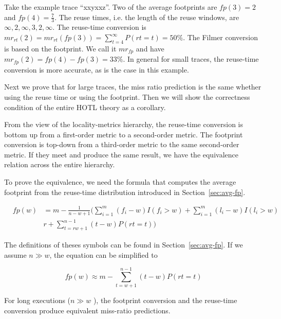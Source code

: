 Take the example trace ``xxyxxz''.  Two of the average footprints are
$fp(3) = 2$ and $fp(4) = \frac{7}{3}$.  The reuse times, i.e. the
length of the reuse windows, are $\infty, 2, \infty, 3, 2, \infty$.
The reuse-time conversion is $mr_{rt}( 2 ) = mr_{rt}(fp(3) ) =
\sum_{t=4}^{\infty} P(rt = t) = 50\%$. The Filmer conversion is based
on the footprint.  We call it $mr_{fp}$ and have $mr_{fp}( 2 ) = fp(4)
- fp(3) = 33\%$. In general for small traces, the reuse-time
conversion is more accurate, as is the case in this example.

\medskip

Next we prove that for large traces, the miss ratio prediction is the
same whether using the reuse time or using the footprint.  Then we
will show the correctness condition of the entire HOTL theory as a corollary.

From the view of the locality-metrics hierarchy, the reuse-time conversion is
bottom up from a first-order metric to a second-order metric.
The footprint conversion is top-down from a third-order metric to
the same second-order metric.  If they meet and produce the same result,
we have the equivalence relation across the entire hierarchy.

To prove the equivalence, we need the formula that computes the
average footprint from the reuse-time distribution introduced in
Section~\ref{sec:avg-fp}. 

\begin{lemma}
\begin{eqnarray}
\label{eq1}
& fp(w)
&=m-\frac{1}{n-w+1}(\sum_{i=1}^{m}(f_i-w)I(f_i>w)+\sum_{i=1}^{m}(l_i-w)I(l_i>w)\nonumber
\\
& &r+\sum_{t=rw+1}^{n-1}(t - w)P(rt=t))
\end{eqnarray}
\label{eq:pact11}
\end{lemma}

\noindent The definitions of theses symbols can be found in
Section~\ref{sec:avg-fp}. If we assume $n \gg w$, the equation can be simplified to

$$fp(w) \approx m - \sum_{t=w+1}^{n-1}(t - w) P(rt=t) $$

\begin{theorem} For
  long executions ($n \gg w$ ), the footprint conversion   and the
  reuse-time conversion produce equivalent miss-ratio predictions. 
\label{cteq}
\end{theorem}

